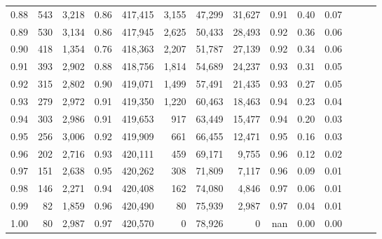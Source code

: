 \begin{tabular}{rrrrrrrrrrrrrr}
0.88 &     543 &  3,218 &  0.86 &  417,415 &    3,155 &  47,299 &  31,627 &  0.91 &  0.40 &      0.07 \\
0.89 &     530 &  3,134 &  0.86 &  417,945 &    2,625 &  50,433 &  28,493 &  0.92 &  0.36 &      0.06 \\
0.90 &     418 &  1,354 &  0.76 &  418,363 &    2,207 &  51,787 &  27,139 &  0.92 &  0.34 &      0.06 \\
0.91 &     393 &  2,902 &  0.88 &  418,756 &    1,814 &  54,689 &  24,237 &  0.93 &  0.31 &      0.05 \\
0.92 &     315 &  2,802 &  0.90 &  419,071 &    1,499 &  57,491 &  21,435 &  0.93 &  0.27 &      0.05 \\
0.93 &     279 &  2,972 &  0.91 &  419,350 &    1,220 &  60,463 &  18,463 &  0.94 &  0.23 &      0.04 \\
0.94 &     303 &  2,986 &  0.91 &  419,653 &      917 &  63,449 &  15,477 &  0.94 &  0.20 &      0.03 \\
0.95 &     256 &  3,006 &  0.92 &  419,909 &      661 &  66,455 &  12,471 &  0.95 &  0.16 &      0.03 \\
0.96 &     202 &  2,716 &  0.93 &  420,111 &      459 &  69,171 &   9,755 &  0.96 &  0.12 &      0.02 \\
0.97 &     151 &  2,638 &  0.95 &  420,262 &      308 &  71,809 &   7,117 &  0.96 &  0.09 &      0.01 \\
0.98 &     146 &  2,271 &  0.94 &  420,408 &      162 &  74,080 &   4,846 &  0.97 &  0.06 &      0.01 \\
0.99 &      82 &  1,859 &  0.96 &  420,490 &       80 &  75,939 &   2,987 &  0.97 &  0.04 &      0.01 \\
1.00 &      80 &  2,987 &  0.97 &  420,570 &        0 &  78,926 &       0 &   nan &  0.00 &      0.00 \\
\bottomrule
\end{tabular}
